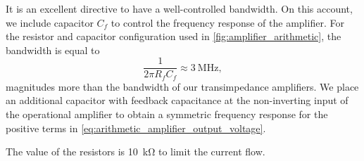 It is an excellent directive to have a well-controlled bandwidth.
On this account, we include capacitor $C_f$ to control the frequency response of the amplifier. 
For the resistor and capacitor configuration used in \cref{fig:amplifier_arithmetic}, the bandwidth is equal to
\begin{equation}
	\frac{1}{2\pi R_fC_f}\approx\SI{3}{\mega\hertz},
\end{equation}
magnitudes more than the bandwidth of our transimpedance amplifiers.
We place an additional capacitor with feedback capacitance at the non-inverting input of the operational amplifier to obtain a symmetric frequency response for the positive terms in \cref{eq:arithmetic_amplifier_output_voltage}.

The value of the resistors is \SI{10}{\kilo\ohm} to limit the current flow.

